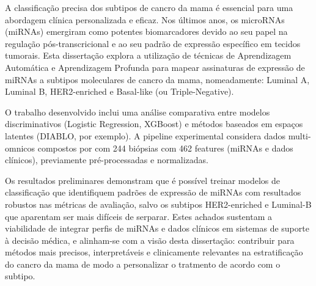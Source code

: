 
%

A classificação precisa dos subtipos de cancro da mama é essencial para uma
abordagem clínica personalizada e eficaz. Nos últimos anos, os microRNAs
(miRNAs) emergiram como potentes biomarcadores devido ao seu papel na regulação
pós-transcricional e ao seu padrão de expressão específico em tecidos tumorais.
Esta dissertação explora a utilização de técnicas de Aprendizagem Automática e
Aprendizagem Profunda para mapear assinaturas de expressão de miRNAs a subtipos
moleculares de cancro da mama, nomeadamente: Luminal A, Luminal B,
HER2-enriched e Basal-like (ou Triple-Negative).

O trabalho desenvolvido inclui uma análise comparativa entre modelos
discriminativos (Logistic Regression, XGBoost) e métodos baseados em espaços
latentes (DIABLO, por exemplo). A pipeline experimental considera dados
multi-omnicos compostos por com 244 biópsias com 462 features (miRNAs e dados
clínicos), previamente pré-processadas e normalizadas.

Os resultados preliminares demonstram que é possível treinar modelos de
classificação que identifiquem padrões de expressão de miRNAs com resultados
robustos nas métricas de avaliação, salvo os subtipos HER2-enriched e Luminal-B
que aparentam ser mais difíceis de serparar. Estes achados sustentam a
viabilidade de integrar perfis de miRNAs e dados clínicos em sistemas de
suporte à decisão médica, e alinham-se com a visão desta dissertação:
contribuir para métodos mais precisos, interpretáveis e clinicamente relevantes
na estratificação do cancro da mama de modo a personalizar o tratmento de
acordo com o subtipo.

